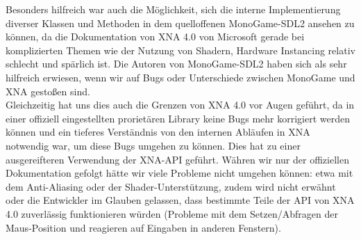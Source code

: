 Besonders hilfreich war auch die Möglichkeit, sich die interne Implementierung diverser Klassen und Methoden in dem quelloffenen MonoGame-SDL2 ansehen zu können, da die Dokumentation von XNA 4.0 von Microsoft gerade bei komplizierten Themen wie der Nutzung von Shadern, Hardware Instancing relativ schlecht und spärlich ist. Die Autoren von MonoGame-SDL2 haben sich als sehr hilfreich erwiesen, wenn wir auf Bugs oder Unterschiede zwischen MonoGame und XNA gestoßen sind.\\

Gleichzeitig hat uns dies auch die Grenzen von XNA 4.0 vor Augen geführt, da in einer offiziell eingestellten prorietären Library keine Bugs mehr korrigiert werden können und ein tieferes Verständnis von den internen Abläufen in XNA notwendig war, um diese Bugs umgehen zu können. Dies hat zu einer ausgereifteren Verwendung der XNA-API geführt. Währen wir nur der offiziellen Dokumentation gefolgt hätte wir viele Probleme nicht umgehen können: etwa mit dem Anti-Aliasing oder der Shader-Unterstützung, zudem wird nicht erwähnt oder die Entwickler im Glauben gelassen, dass bestimmte Teile der API von XNA 4.0 zuverlässig funktionieren würden (Probleme mit dem Setzen/Abfragen der Maus-Position und reagieren auf Eingaben in anderen Fenstern).\\







